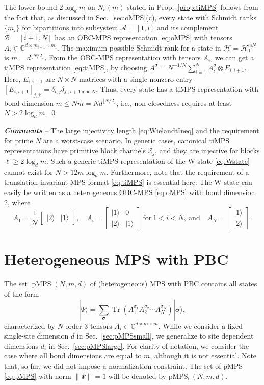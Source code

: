 \documentclass[english,11pt,aps,pra,onecolumn,tightenlines,groupedaddress,superscriptaddress,notitlepage,floatfix,fleqn]{revtex4-1}
\newcommand{\ket}{\rangle}
\newcommand{\Tr}{\operatorname{Tr}}
\renewcommand{\vec}[1]{{\boldsymbol{#1}}}
\newcommand{\s}{\sigma}
\newcommand{\vs}{\vec{\sigma}}
\newcommand{\CC}{\mathbb{C}}
\newcommand{\mc}[1]{\mathcal{#1}}
\renewcommand{\H}{\mc{H}}
\newcommand{\A}{\mc{A}}
\newcommand{\B}{\mc{B}}
\newcommand{\E}{\mc{E}}
\newcommand{\pMPS}{\operatorname{pMPS}}
\newcommand{\pMPSn}{\operatorname{pMPS_n}}
\renewcommand{\Bmatrix}[1]{\begin{bmatrix}#1\end{bmatrix}}
\newcommand{\Emph}[1]{\textbf{\emph{#1}}}
\begin{document}
The lower bound $2\log_d m$ on $N_c(m)$ stated in Prop.~\ref{prop:tiMPS} follows from the fact that, as discussed in Sec.~\ref{sec:oMPS}(c), every state with Schmidt ranks $\{m_i\}$ for bipartitions into subsystem $\A=[1,i]$ and its complement $\B=[i+1,N]$ has an OBC-MPS representation \eqref{eq:oMPS} with tensors $A_i\in\CC^{d\times m_{i-1}\times m_i}$. The maximum possible Schmidt rank for a state in $\H=\H_1^{\otimes N}$ is $\tilde{m}=d^{\lfloor N/2\rfloor}$. From the OBC-MPS representation with tensors $A_i$, we can get a tiMPS representation \eqref{eq:tiMPS}, by choosing $A^\s=N^{-1/N}\sum_{i=1}^N A_i^\s \otimes E_{i,i+1}$. Here, $E_{i,i+1}$ are $N\times N$ matrices with a single nonzero entry $[E_{i,i+1}]_{j,j'}=\delta_{i,j}\delta_{j',i+1\,\mathrm{mod}\,N}$. Thus, every state has a tiMPS representation with bond dimension $m\leq N \tilde{m}=N d^{\lfloor N/2\rfloor}$, i.e., non-closedness requires at least $N>2\log_d m$.
\qed

\Emph{Comments} -- The large injectivity length \eqref{eq:WielandtIneq} and the requirement for prime $N$ are a worst-case scenario. In generic cases, canonical tiMPS representations have primitive block channels $\E_j$, and they are injective for blocks $\ell \geq 2 \log_d m$. Such a generic tiMPS representation of the W state \eqref{eq:Wstate} cannot exist for $N>12 m\log_d m$. Furthermore, note that the requirement of a translation-invariant MPS format \eqref{eq:tiMPS} is essential here: The W state can easily be written as a heterogeneous OBC-MPS \eqref{eq:oMPS} with bond dimension 2, where
\begin{equation}\label{eq:psiWA-obc}
	A_1=\frac{1}{\mc{N}}\Bmatrix{|2\ket&|1\ket},\quad
	A_i=\Bmatrix{|1\ket& 0\\|2\ket&|1\ket} \ \text{for} \ 1<i<N, \ \text{and}\quad 
	A_N=\Bmatrix{|1\ket\\|2\ket}.
\end{equation}


\section{Heterogeneous MPS with PBC}\label{sec:pMPS}
The set $\pMPS(N,m,d)$ of (heterogeneous) MPS with PBC contains all states of the form
\begin{equation}\label{eq:pMPS}
	|\Psi\ket=\sum_\vs \Tr \left( A_1^{\s_1}A_2^{\s_2}\dotsb A_N^{\s_N}\right)|\vs\ket,
\end{equation}
characterized by $N$ order-3 tensors $A_i\in \CC^{d\times m\times m}$. While we consider a fixed single-site dimension $d$ in Sec.~\ref{sec:pMPSsmall}, we generalize to site dependent dimensions $d_i$ in Sec.~\ref{sec:pMPSlarge}.
For clarity of notation, we consider the case where all bond dimensions are equal to $m$, although it is not essential. Note that, so far, we did not impose a normalization constraint. The set of pMPS \eqref{eq:pMPS} with norm $\|\Psi\|=1$ will be denoted by $\pMPSn(N,m,d)$.
\end{document}

